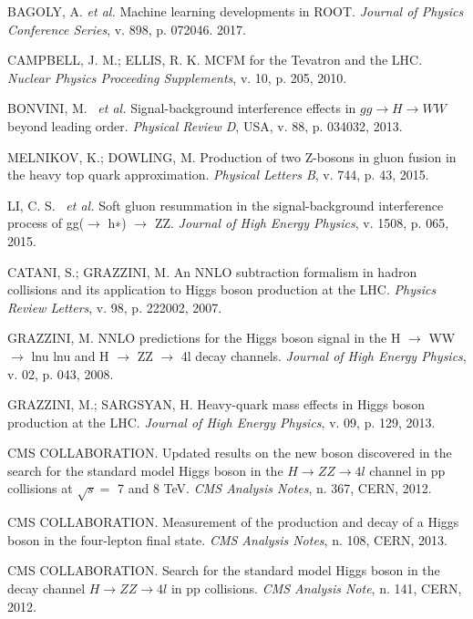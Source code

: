 \begin{thebibliography}{}
BAGOLY, A. \textit{et al.} Machine learning developments in ROOT. \textit{Journal of Physics Conference Series}, v. 898, p. 072046. 2017.

CAMPBELL, J. M.; ELLIS, R. K. MCFM for the Tevatron and the LHC. \textit{Nuclear Physics Proceeding Supplements}, v. 10, p. 205, 2010.

BONVINI, M. ~\textit{et al.} Signal-background interference effects in $gg \rightarrow H \rightarrow WW$ beyond leading order. \textit{Physical Review D}, USA, v. 88, p. 034032, 2013.

MELNIKOV, K.; DOWLING, M. Production of two Z-bosons in gluon fusion in the heavy top quark approximation. \textit{Physical Letters B}, v. 744, p. 43, 2015.

LI, C. S. ~\textit{et al.} Soft gluon resummation in the signal-background interference process of gg($\rightarrow$ h∗) $\rightarrow$ ZZ. \textit{Journal of High Energy Physics}, v. 1508, p. 065, 2015.

CATANI, S.; GRAZZINI, M. An NNLO subtraction formalism in hadron collisions and its application to Higgs boson production at the LHC. \textit{Physics Review Letters}, v. 98, p. 222002, 2007.

GRAZZINI, M. NNLO predictions for the Higgs boson signal in the H $\rightarrow$ WW $\rightarrow$ lnu lnu and H $\rightarrow$ ZZ $\rightarrow$ 4l decay channels. \textit{Journal of High Energy Physics}, v. 02, p. 043, 2008.

GRAZZINI, M.; SARGSYAN, H. Heavy-quark mass effects in Higgs boson production at the LHC. \textit{Journal of High Energy Physics}, v. 09, p. 129, 2013.

CMS COLLABORATION. Updated results on the new boson discovered in the search for the standard model Higgs boson in the $H \rightarrow ZZ \rightarrow 4l$ channel in pp collisions at $\sqrt{s}=$ 7 and 8 TeV. \textit{CMS Analysis Notes}, n. 367, CERN, 2012.

CMS COLLABORATION. Measurement of the production and decay of a Higgs boson in the four-lepton final state. \textit{CMS Analysis Notes}, n. 108, CERN, 2013.

CMS COLLABORATION. Search for the standard model Higgs boson in the decay channel $H \rightarrow ZZ \rightarrow 4l$ in pp collisions. \textit{CMS Analysis Note}, n. 141, CERN, 2012.


\end{thebibliography}

